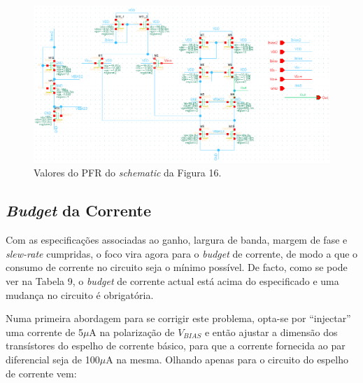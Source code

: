 \documentclass[11pt]{article}
\numberwithin{equation}{section}
\begin{document}
\begin{figure}[H]
	\centering
	\includegraphics[keepaspectratio=true, scale=0.85]{exps/PFRajustesF1}
	\vspace{-0.5em}
	\caption{Valores do PFR do \textit{schematic} da Figura 16.}
	\vspace{-0.8em}
\end{figure} 


\subsection{\textit{Budget} da Corrente}

Com as especificações associadas ao ganho, largura de banda, margem de fase e \textit{slew-rate} cumpridas, o foco vira agora para o \textit{budget} de corrente, de modo a que o consumo de corrente no circuito seja o mínimo possível. De facto, como se pode ver na Tabela 9, o \textit{budget} de corrente actual está acima do especificado e uma mudança no circuito é obrigatória.

Numa primeira abordagem para se corrigir este problema, opta-se por ``injectar'' uma corrente de 5$\mu$A na polarização de $V_{BIAS}$ e então ajustar a dimensão dos transístores do espelho de corrente básico, para que a corrente fornecida ao par diferencial seja de 100$\mu$A na mesma. Olhando apenas para o circuito do espelho de corrente vem:
\end{document}
